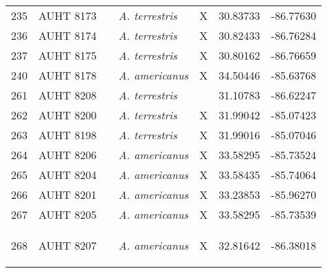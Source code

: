 \begin{longtable}{ lllllll }
235 & AUHT 8173 &  & \textit{A. terrestris} & X & 30.83733 & -86.77630 \\ 
236 & AUHT 8174 &  & \textit{A. terrestris} & X & 30.82433 & -86.76284 \\ 
237 & AUHT 8175 &  & \textit{A. terrestris} & X & 30.80162 & -86.76659 \\ 
240 & AUHT 8178 &  & \textit{A. americanus} & X & 34.50446 & -85.63768 \\ 
261 & AUHT 8208 &  & \textit{A. terrestris} &  & 31.10783 & -86.62247 \\ 
262 & AUHT 8200 &  & \textit{A. terrestris} & X & 31.99042 & -85.07423 \\ 
263 & AUHT 8198 &  & \textit{A. terrestris} & X & 31.99016 & -85.07046 \\ 
264 & AUHT 8206 &  & \textit{A. americanus} & X & 33.58295 & -85.73524 \\ 
265 & AUHT 8204 &  & \textit{A. americanus} & X & 33.58435 & -85.74064 \\ 
266 & AUHT 8201 &  & \textit{A. americanus} & X & 33.23853 & -85.96270 \\ 
267 & AUHT 8205 &  & \textit{A. americanus} & X & 33.58295 & -85.73539 \\ 
268 & AUHT 8207 &  & \textit{A. americanus} & X & 32.81642 & -86.38018

\label{table:collectedHyb }
\end{longtable}